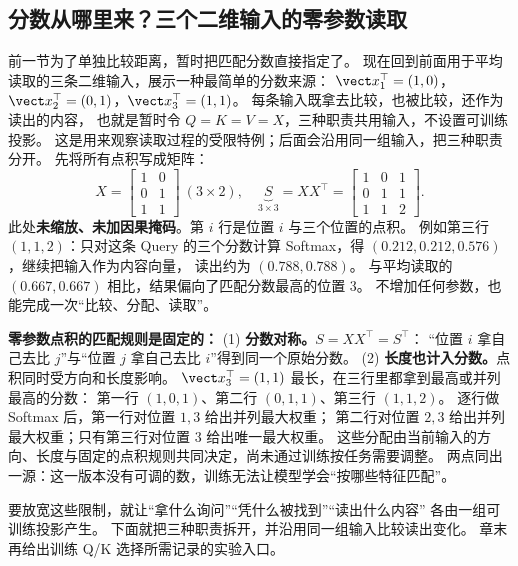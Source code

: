 \subsection{分数从哪里来？三个二维输入的零参数读取}

前一节为了单独比较距离，暂时把匹配分数直接指定了。
现在回到前面用于平均读取的三条二维输入，展示一种最简单的分数来源：
$\vect x_1^\top=(1,0)$，$\vect x_2^\top=(0,1)$，$\vect x_3^\top=(1,1)$。
每条输入既拿去比较，也被比较，还作为读出的内容，
也就是暂时令 $Q=K=V=X$，三种职责共用输入，不设置可训练投影。
这是用来观察读取过程的受限特例；后面会沿用同一组输入，把三种职责分开。
先将所有点积写成矩阵：
\[
X=\begin{bmatrix}1&0\\0&1\\1&1\end{bmatrix}
\ (3\times2),\quad
\underbrace{S}_{3\times3}=XX^\top
=\boxed{\begin{bmatrix}1&0&1\\0&1&1\\1&1&2\end{bmatrix}}.
\]
此处\textbf{未缩放、未加因果掩码}。第 $i$ 行是位置 $i$ 与三个位置的点积。
例如第三行 $(1,1,2)$：只对这条 Query 的三个分数计算 Softmax，得
$(0.212,0.212,0.576)$，继续把输入作为内容向量，
读出约为 $(0.788,0.788)$。
与平均读取的 $(0.667,0.667)$ 相比，结果偏向了匹配分数最高的位置 3。
不增加任何参数，也能完成一次“比较、分配、读取”。

\begin{boundarybox}
\textbf{零参数点积的匹配规则是固定的：}
(1) \textbf{分数对称。}$S=XX^\top=S^\top$：
“位置 $i$ 拿自己去比 $j$”与“位置 $j$ 拿自己去比 $i$”得到同一个原始分数。
(2) \textbf{长度也计入分数。}点积同时受方向和长度影响。
$\vect x_3^\top=(1,1)$ 最长，在三行里都拿到最高或并列最高的分数：
第一行 $(1,0,1)$、第二行 $(0,1,1)$、第三行 $(1,1,2)$。
逐行做 Softmax 后，第一行对位置 $1,3$ 给出并列最大权重；
第二行对位置 $2,3$ 给出并列最大权重；只有第三行对位置 $3$ 给出唯一最大权重。
这些分配由当前输入的方向、长度与固定的点积规则共同决定，尚未通过训练按任务需要调整。
两点同出一源：这一版本没有可调的数，训练无法让模型学会“按哪些特征匹配”。
\end{boundarybox}

要放宽这些限制，就让“拿什么询问”“凭什么被找到”“读出什么内容”
各由一组可训练投影产生。
下面就把三种职责拆开，并沿用同一组输入比较读出变化。
章末再给出训练 Q/K 选择所需记录的实验入口。
